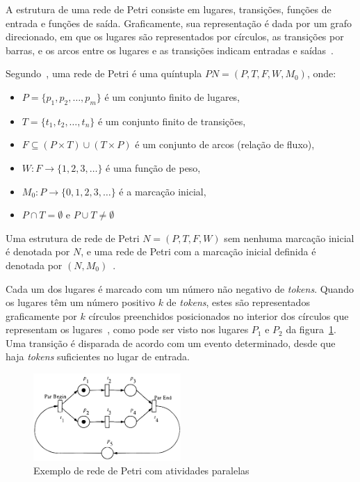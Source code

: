 A estrutura de uma rede de Petri consiste em lugares, transições, funções de entrada e funções de saída. Graficamente, sua representação é dada por um grafo direcionado, em que os lugares são representados por círculos, as transições por barras, e os arcos entre os lugares e as transições indicam entradas e saídas~\cite{peterson:1981}. %

Segundo~, uma rede de Petri é uma quíntupla \(PN = (P, T, F, W, M_0)\), onde:
\begin{itemize}
    \item \(P = \{p_1, p_2, \ldots , p_m\}\) é um conjunto finito de lugares,
    \item \(T = \{t_1, t_2, \ldots, t_n\}\) é um conjunto finito de transições,
    \item \(F \subseteq (P \times T) \cup (T \times P)\) é um conjunto de arcos (relação de fluxo),
    \item \(W: F \to \{1,2,3,\ldots\}\) é uma função de peso,
    \item \(M_0: P \to \{0,1,2,3,\ldots\}\) é a marcação inicial,
    \item \(P \cap T = \emptyset\) e \(P \cup T \neq \emptyset\)
\end{itemize}

Uma estrutura de rede de Petri \(N=(P,T,F,W)\) sem nenhuma marcação inicial é denotada por \(N\), e uma rede de Petri com a marcação inicial definida é denotada por \((N,M_0)\)~\cite{murata:1989}.

Cada um dos lugares é marcado com um número não negativo de \textit{tokens}. Quando os lugares têm um número positivo \(k\) de \textit{tokens}, estes são representados graficamente por \(k\) círculos preenchidos posicionados no interior dos círculos que representam os lugares~\cite{murata:1989}, como pode ser visto nos lugares \(P_1\) e \(P_2\) da figura~\ref{fig:petrinet}. Uma transição é disparada de acordo com um evento determinado, desde que haja \textit{tokens} suficientes no lugar de entrada.

\begin{figure}[ht]
	\caption{\label{fig:petrinet}Exemplo de rede de Petri com atividades paralelas}
	\begin{center}
	    \includegraphics[width=0.5\textwidth]{resources/petri_net_murata_1}
	\end{center}
\end{figure}

